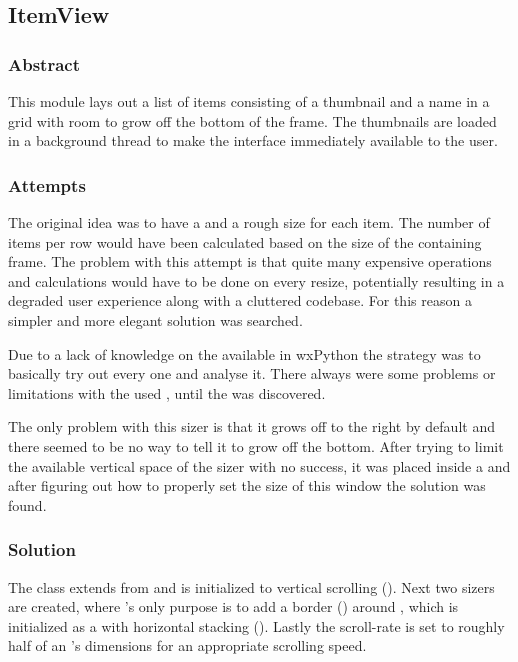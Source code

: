 \subsection{ItemView}
\def\kapitelautor{Clemens Stadlbauer}
\label{subsec:mod:itemview}

\subsubsection{Abstract}
This module lays out a list of items consisting of a thumbnail and a name in a
grid with room to grow off the bottom of the frame. The thumbnails are loaded
in a background thread to make the interface immediately available to the user.

\subsubsection{Attempts}
The original idea was to have a  and a rough size for each
item. The number of items per row would have been calculated based on the size
of the containing frame. The problem with this attempt is that quite many
expensive operations and calculations would have to be done on every resize,
potentially resulting in a degraded user experience along with a cluttered
codebase. For this reason a simpler and more elegant solution was searched.

Due to a lack of knowledge on the available  in
wxPython the strategy was to basically try out every one and
analyse it. There always were some problems or limitations with the used
, until the  was discovered.

The only problem with this sizer is that it grows off to the right by default
and there seemed to be no way to tell it to grow off the bottom. After trying
to limit the available vertical space of the sizer with no success, it was
placed inside a  and after figuring out how to properly
set the size of this window the solution was found.

\subsubsection{Solution} %

\begin{sloppypar}
The  class extends from  and is
initialized to vertical scrolling (). Next
two sizers are created, where 's only purpose is to add a
border () around
, which is initialized as a  with horizontal
stacking (). Lastly the scroll-rate is set
to roughly half of an 's dimensions for an appropriate scrolling
speed.
\end{sloppypar}

